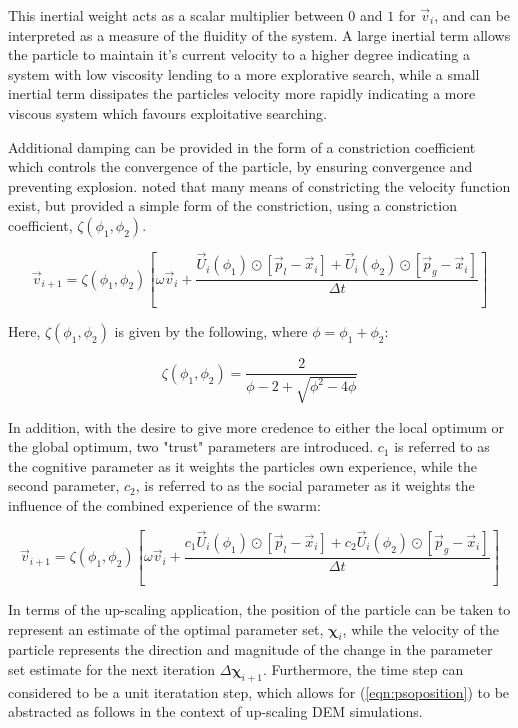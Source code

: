 This inertial weight acts as a scalar multiplier between $0$ and $1$ for $\vec{v}_i$, and can be interpreted as a measure of the fluidity of the system. A large inertial term allows the particle to maintain it's current velocity to a higher degree indicating a system with low viscosity lending to a more explorative search, while a small inertial term dissipates the particles velocity more rapidly indicating a more viscous system which favours exploitative searching. 

Additional damping can be provided in the form of a constriction coefficient which controls the convergence of the particle, by ensuring convergence and preventing explosion. \citet{Clerc_2002} noted that many means of constricting the velocity function exist, but provided a simple form of the constriction, using a constriction coefficient, $\zeta\left(\phi_1, \phi_2\right)$. 

\begin{equation}
\vec{v}_{i+1} = \zeta\left(\phi_1, \phi_2\right) \left[\omega\vec{v}_i + \frac{\vec{U}_i\left(\phi_1\right)\odot\left[\vec{p}_l-\vec{x}_i\right] + \vec{U}_i\left(\phi_2\right)\odot\left[\vec{p}_g-\vec{x}_i\right]}{\Delta t}\right]
\label{eqn:psoconstriction}
\end{equation}

Here, $\zeta\left(\phi_1, \phi_2\right)$ is given by the following, where $\phi=\phi_1+\phi_2$:

\begin{equation}
\zeta\left(\phi_1, \phi_2\right) = \frac{2}{\phi-2+\sqrt{\phi^2-4\phi}}
\label{eqn:psoconstriction2}
\end{equation}

In addition, with the desire to give more credence to either the local optimum or the global optimum, two "trust" parameters are introduced. $c_1$ is referred to as the cognitive parameter as it weights the particles own experience, while the second parameter, $c_2$, is referred to as the social parameter as it weights the influence of the combined experience of the swarm:

\begin{equation}
\vec{v}_{i+1} = \zeta\left(\phi_1, \phi_2\right) \left[\omega\vec{v}_i + \frac{c_1\vec{U}_i\left(\phi_1\right)\odot\left[\vec{p}_l-\vec{x}_i\right] + c_2\vec{U}_i\left(\phi_2\right)\odot\left[\vec{p}_g-\vec{x}_i\right]}{\Delta t}\right]
\label{eqn:psoposition}
\end{equation}

In terms of the up-scaling application, the position of the particle can be taken to represent an estimate of the optimal parameter set, $\boldsymbol{\chi}_i$, while the velocity of the particle represents the direction and magnitude of the change in the parameter set estimate for the next iteration $\Delta\boldsymbol{\chi}_{i+1}$. Furthermore, the time step can considered to be a unit iteratation step, which allows for (\ref{eqn:psoposition}) to be abstracted as follows in the context of up-scaling DEM simulations.

